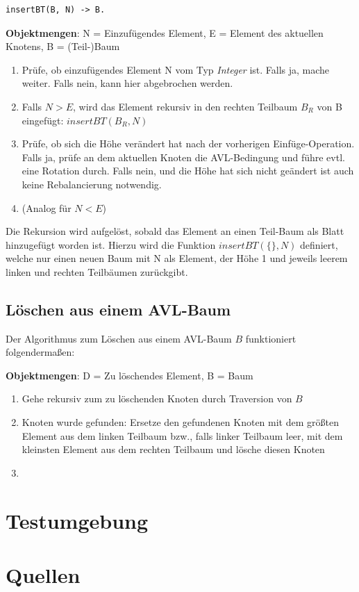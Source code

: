 \documentclass{article}
\begin{document}
\begin{lstlisting}
insertBT(B, N) -> B.
\end{lstlisting}

	\textbf{Objektmengen}: N = Einzufügendes Element, E = Element des aktuellen Knotens, B = (Teil-)Baum
	
	\begin{enumerate}
		\item Prüfe, ob einzufügendes Element N vom Typ \textit{Integer} ist. Falls ja, mache weiter. Falls nein, kann hier abgebrochen werden.
		\item Falls $N > E$, wird das Element rekursiv in den rechten Teilbaum $B_R$ von B eingefügt: $insertBT(B_R, N)$
		\item Prüfe, ob sich die Höhe verändert hat nach der vorherigen Einfüge-Operation. Falls ja, prüfe an dem aktuellen Knoten die AVL-Bedingung und führe evtl. eine Rotation durch. Falls nein, und die Höhe hat sich nicht geändert ist auch keine Rebalancierung notwendig. 
		\item (Analog für $N < E$)
	\end{enumerate}
	
	Die Rekursion wird aufgelöst, sobald das Element an einen Teil-Baum als Blatt hinzugefügt worden ist. Hierzu wird die Funktion $insertBT(\{\}, N)$ definiert, welche nur einen neuen Baum mit N als Element, der Höhe 1 und jeweils leerem linken und rechten Teilbäumen zurückgibt.
	
	\subsection{Löschen aus einem AVL-Baum}

	Der Algorithmus zum Löschen aus einem AVL-Baum $B$ funktioniert folgendermaßen:
	
	\textbf{Objektmengen}: D = Zu löschendes Element, B = Baum
	
	\begin{enumerate}
		\item Gehe rekursiv zum zu löschenden Knoten durch Traversion von $B$
		\item Knoten wurde gefunden: Ersetze den gefundenen Knoten mit dem größten Element aus dem linken Teilbaum bzw., falls linker Teilbaum leer, mit dem kleinsten Element aus dem rechten Teilbaum und lösche diesen Knoten
		\item 
	\end{enumerate}

  	\newpage
  	\section{Testumgebung}
  
  	\newpage
  	\section{Quellen}
\end{document}
